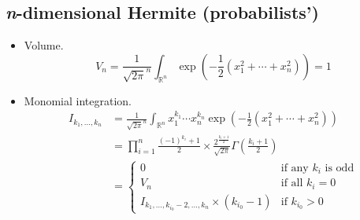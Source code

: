 \documentclass[final]{scrartcl}
\begin{document}
\subsection*{\textit{n}-dimensional Hermite (probabilists')}
\begin{itemize}
  \item Volume.
    \begin{equation}
      V_n = \frac{1}{\sqrt{2\pi}^n} \int_{\mathbb{R}^n}
      \exp\left(-\frac{1}{2}(x_1^2+\cdots+x_n^2)\right) = 1
    \end{equation}


  \item Monomial integration.
  \begin{align}\nonumber
    I_{k_1,\dots,k_n}
      &= \frac{1}{\sqrt{2\pi}^n} \int_{\mathbb{R}^n} x_1^{k_1}\cdots x_n^{k_n}
      \exp\left(-\frac{1}{2}(x_1^2+\cdots+x_n^2)\right)\\
    &= \prod_{i=1}^n \frac{(-1)^{k_i} + 1}{2} \times
      \frac{2^{\frac{k_i+1}{2}}}{\sqrt{2\pi}} \Gamma\left(\frac{k_i+1}{2}\right)\\
    &=\begin{cases}
      0&\text{if any $k_i$ is odd}\\
      V_n&\text{if all $k_i=0$}\\
      I_{k_1,\dots,k_{i_0}-2,\dots,k_n} \times (k_{i_0} - 1)&\text{if $k_{i_0} > 0$}
    \end{cases}
  \end{align}
\end{itemize}
\end{document}
